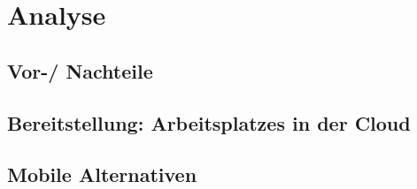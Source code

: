 

\chapter{Analyse}


\section{Vor-/ Nachteile}

\section{Bereitstellung: Arbeitsplatzes in der Cloud}

\section{Mobile Alternativen}

